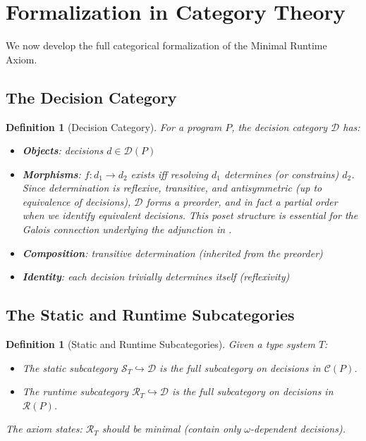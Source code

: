 \documentclass[11pt]{article}
\newtheorem{definition}[theorem]{Definition}
\newcommand{\DP}{\mathcal{D}(P)}
\newcommand{\CP}{\mathcal{C}(P)}
\newcommand{\RP}{\mathcal{R}(P)}
\begin{document}
\section{Formalization in Category Theory}
\label{sec:category-theory}

We now develop the full categorical formalization of the Minimal Runtime Axiom.

\subsection{The Decision Category}

\begin{definition}[Decision Category]
\label{def:decision-category}
For a program $P$, the \emph{decision category} $\mathcal{D}$ has:
\begin{itemize}[nosep]
  \item \textbf{Objects}: decisions $d \in \DP$
  \item \textbf{Morphisms}: $f : d_1 \to d_2$ exists iff resolving $d_1$ determines (or constrains) $d_2$. Since determination is reflexive, transitive, and antisymmetric (up to equivalence of decisions), $\mathcal{D}$ forms a \emph{preorder}, and in fact a \emph{partial order} when we identify equivalent decisions. This poset structure is essential for the Galois connection underlying the adjunction in .
  \item \textbf{Composition}: transitive determination (inherited from the preorder)
  \item \textbf{Identity}: each decision trivially determines itself (reflexivity)
\end{itemize}
\end{definition}

\subsection{The Static and Runtime Subcategories}

\begin{definition}[Static and Runtime Subcategories]
\label{def:subcategories}
Given a type system $T$:
\begin{itemize}[nosep]
  \item The \emph{static subcategory} $\mathcal{S}_T \hookrightarrow \mathcal{D}$ is the full subcategory on decisions in $\CP$.
  \item The \emph{runtime subcategory} $\mathcal{R}_T \hookrightarrow \mathcal{D}$ is the full subcategory on decisions in $\RP$.
\end{itemize}
The axiom states: $\mathcal{R}_T$ should be minimal (contain only $\omega$-dependent decisions).
\end{definition}
\end{document}
